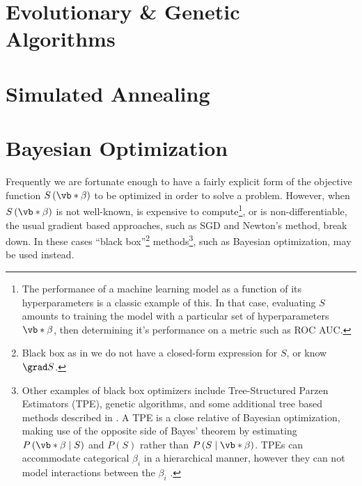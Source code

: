 \section{Evolutionary \& Genetic Algorithms}
\label{opt:evo}

\section{Simulated Annealing}
\label{opt:SA}

\section{Bayesian Optimization}
\label{opt:BO}

Frequently we are fortunate enough to have a fairly explicit form of
the objective function $S\left(\vb*{\beta}\right)$ to be optimized in order to solve a problem.
However, when $S\left(\vb*{\beta}\right)$ is not well-known,
is expensive to compute\footnote{The performance of a machine learning model as a function of its hyperparameters is a classic example of this.
In that case, evaluating $S$ amounts to training the model with a particular set of hyperparameters $\vb*{\beta}$,
then determining it's performance on a metric such as ROC AUC.}, or is non-differentiable,
the usual gradient based approaches, such as SGD and Newton's method, break down.
In these cases ``black box''\footnote{Black box as in
we do not have a closed-form expression for $S$, or know $\grad S$.} methods\footnote{Other examples of black box optimizers include
Tree-Structured Parzen Estimators (TPE),
genetic algorithms,
and some additional tree based methods described in \cite{Hutter2011,Hutter2014}.
A TPE is a close relative of Bayesian optimization, making use of the opposite side of Bayes' theorem by
estimating $P\left(\vb*{\beta} \mid S\right)$ and $P\left(S\right)$ rather than $P\left(S \mid \vb*{\beta}\right)$.
TPEs can accommodate categorical $\beta_{i}$ in a hierarchical manner,
however they can not model interactions between the $\beta_{i}$ \cite{bissuel_2019,NIPS2011_4443}.},
such as Bayesian optimization, may be used instead.

